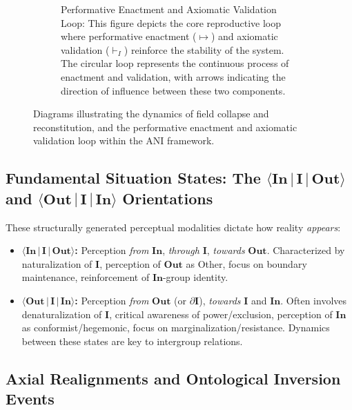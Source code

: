 \documentclass{article}
\newcommand{\Isness}{\mathbf{I}}            %
\newcommand{\Inness}{\mathbf{In}}           %
\newcommand{\Outness}{\mathbf{Out}}         %
\newcommand{\boundary}[1]{\ensuremath{\partial #1}} %
\newcommand{\orientation}[3]{\ensuremath{\langle #1 \,|\, #2 \,|\, #3 \rangle}} %
\begin{document}
\begin{figure}[h!]
\begin{subfigure}[b]{0.45\textwidth}
        \caption{Performative Enactment and Axiomatic Validation Loop: This figure depicts the core reproductive loop where performative enactment ($\mapsto$) and axiomatic validation ($\vdash_I$) reinforce the stability of the system. The circular loop represents the continuous process of enactment and validation, with arrows indicating the direction of influence between these two components.}
        \label{fig:enactment_validation}
    \end{subfigure}
    \caption{Diagrams illustrating the dynamics of field collapse and reconstitution, and the performative enactment and axiomatic validation loop within the ANI framework.}
    \label{fig:combined_1}
\end{figure}

\subsection{Fundamental Situation States: The $\orientation{\Inness}{\Isness}{\Outness}$ and $\orientation{\Outness}{\Isness}{\Inness}$ Orientations}

These structurally generated perceptual modalities dictate how reality \textit{appears}:
\begin{itemize}
    \item \textbf{$\orientation{\Inness}{\Isness}{\Outness}$:} Perception \textit{from} $\Inness$, \textit{through} $\Isness$, \textit{towards} $\Outness$. Characterized by naturalization of $\Isness$, perception of $\Outness$ as Other, focus on boundary maintenance, reinforcement of $\Inness$-group identity.
    \item \textbf{$\orientation{\Outness}{\Isness}{\Inness}$:} Perception \textit{from} $\Outness$ (or $\boundary{\Isness}$), \textit{towards} $\Isness$ and $\Inness$. Often involves denaturalization of $\Isness$, critical awareness of power/exclusion, perception of $\Inness$ as conformist/hegemonic, focus on marginalization/resistance. Dynamics between these states are key to intergroup relations.
\end{itemize}

\subsection{Axial Realignments and Ontological Inversion Events}
\end{document}
